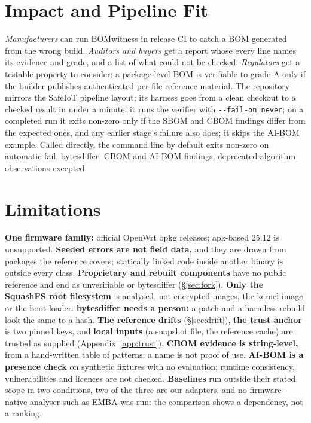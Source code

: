 \documentclass[sigconf,nonacm]{acmart}
\newcommand{\tool}{BOMwitness}
\newcommand{\ubreak}{\textunderscore\allowbreak}
\newcommand{\vd}[1]{{\ttfamily\let\_\ubreak #1}}
\begin{document}
\section{Impact and Pipeline Fit}

\emph{Manufacturers} can run \tool{} in release CI to catch a BOM generated from the wrong build. \emph{Auditors and buyers} get a report whose every line names its evidence and grade, and a list of what could not be checked. \emph{Regulators} get a testable property to consider: a package-level BOM is verifiable to grade A only if the builder publishes authenticated per-file reference material. The repository mirrors the SafeIoT pipeline layout; its harness goes from a clean checkout to a checked result in under a minute: it runs the verifier with \texttt{-{}-fail-on never}; on a completed run it exits non-zero only if the SBOM and CBOM findings differ from the expected ones, and any earlier stage's failure also does; it skips the AI-BOM example. Called directly, the command line by default exits non-zero on automatic-fail, \vd{bytes\_differ}, CBOM and AI-BOM findings, deprecated-algorithm observations excepted.

\section{Limitations}

\textbf{One firmware family:} official OpenWrt opkg releases; apk-based 25.12 is unsupported.
\textbf{Seeded errors are not field data,} and they are drawn from packages the reference covers; statically linked code inside another binary is outside every class.
\textbf{Proprietary and rebuilt components} have no public reference and end as \vd{unverifiable} or \vd{bytes\_differ} (\S\ref{sec:fork}).
\textbf{Only the SquashFS root filesystem} is analysed, not encrypted images, the kernel image or the boot loader.
\textbf{\vd{bytes\_differ} needs a person:} a patch and a harmless rebuild look the same to a hash.
\textbf{The reference drifts} (\S\ref{sec:drift}), \textbf{the trust anchor} is two pinned keys, and \textbf{local inputs} (a snapshot file, the reference cache) are trusted as supplied (Appendix~\ref{app:trust}).
\textbf{CBOM evidence is string-level,} from a hand-written table of \nAlgPatterns{} patterns: a name is not proof of use.
\textbf{AI-BOM is a presence check} on synthetic fixtures with no evaluation; runtime consistency, vulnerabilities and licences are not checked.
\textbf{Baselines} run outside their stated scope in two conditions, two of the three are our adapters, and no firmware-native analyser such as EMBA was run: the comparison shows a dependency, not a ranking.
\end{document}
